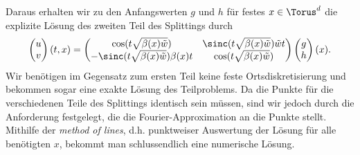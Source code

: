Daraus erhalten wir zu den Anfangswerten $g$ und $h$ für festes $x\in \Torus^d$ die explizite Lösung des zweiten Teil des Splittings durch
\[\begin{pmatrix}u\\v\end{pmatrix}(t,x)=
\begin{pmatrix}\cos(t\sqrt{\beta(x)\tilde{w}}) & \sinc(t\sqrt{\beta(x)\tilde{w}})\tilde{w}t\\
-\sinc(t\sqrt{\beta(x)\tilde{w}})\beta(x)t & \cos(t\sqrt{\beta(x)\tilde{w}})\end{pmatrix}
\begin{pmatrix}g\\h\end{pmatrix}(x).\]
Wir benötigen im Gegensatz zum ersten Teil keine feste Ortsdiskretisierung und bekommen sogar eine exakte Lösung des Teilproblems. Da die Punkte für die verschiedenen Teile des Splittings identisch sein müssen, sind wir jedoch durch die Anforderung festgelegt, die die Fourier-Approximation an die Punkte stellt.\\
Mithilfe der \emph{method of lines}, d.h. punktweiser Auswertung der Lösung für alle benötigten $x$, bekommt man schlussendlich eine numerische Lösung.
